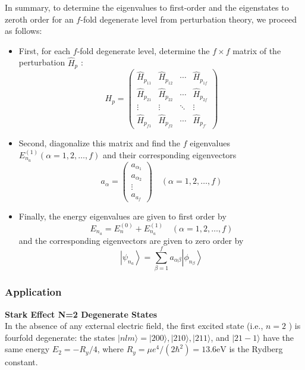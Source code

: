  In summary, to determine the eigenvalues to first-order and the eigenstates to zeroth order for an $f$-fold degenerate level from perturbation theory, we proceed as follows:
 \begin{itemize}
 	\item First, for each $f$-fold degenerate level, determine the $f \times f$ matrix of the perturbation $\hat{H}_{p}$ :
 	$$H_{p}=\left(\begin{array}{cccc}
 		\hat{H}_{p_{11}} & \hat{H}_{p_{12}} & \cdots & \hat{H}_{p_{1 f}} \\
 		\hat{H}_{p_{21}} & \hat{H}_{p_{22}} & \cdots & \hat{H}_{p_{2 f}} \\
 		\vdots & \vdots & \ddots & \vdots \\
 		\hat{H}_{p_{f 1}} & \hat{H}_{p_{f 2}} & \cdots & \hat{H}_{p_{f \prime}}
 	\end{array}\right)$$
 	\item Second, diagonalize this matrix and find the $f$ eigenvalues $E_{n_{a}}^{(1)}(\alpha=1,2, \ldots, f)$ and their corresponding eigenvectors\\
 	$$a_{\alpha}=\left(\begin{array}{c}
 		a_{\alpha_{1}} \\
 		a_{\alpha_{2}} \\
 		\vdots \\
 		a_{a_{f}}
 	\end{array}\right) \quad(\alpha=1,2, \ldots, f)$$
 	\item Finally, the energy eigenvalues are given to first order by
 	$$
 	E_{n_{a}}=E_{n}^{(0)}+E_{n_{a}}^{(1)} \quad(\alpha=1,2, \ldots, f)
 	$$
 	and the corresponding eigenvectors are given to zero order by
 	$$
 	\left|\psi_{n_{a}}\right\rangle=\sum_{\beta=1}^{f} a_{\alpha \beta}\left|\phi_{n_{\beta}}\right\rangle
 	$$
 \end{itemize}

\subsubsection{Application}
\textbf{Stark Effect N=2 Degenerate States}\\
In the absence of any external electric field, the first excited state (i.e., $n=2$ ) is fourfold degenerate: the states $|n l m\rangle=|200\rangle,|210\rangle,|211\rangle$, and $|21-1\rangle$ have the same energy $E_{2}=-R_{y} / 4$, where $R_{y}=\mu e^{4} /\left(2 \hbar^{2}\right)=13.6 \mathrm{eV}$ is the Rydberg constant.


